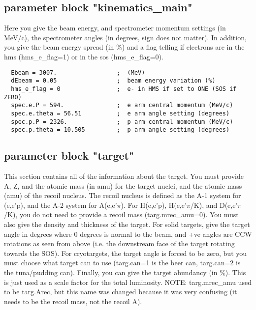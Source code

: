 \subsection{parameter block "kinematics\_main"}

Here you give the beam energy, and spectrometer momentum settings (in MeV/c),
the spectrometer angles (in degrees, sign does not matter).  In addition,
you give the beam energy spread (in \%) and a flag telling if electrons 
are in the hms (hms\_e\_flag=1) or in the sos (hms\_e\_flag=0).

\begin{verbatim}
  Ebeam = 3007.                 ;  (MeV)
  dEbeam = 0.05                 ;  beam energy variation (%)
  hms_e_flag = 0                ;  e- in HMS if set to ONE (SOS if ZERO)
  spec.e.P = 594.               ;  e arm central momentum (MeV/c)
  spec.e.theta = 56.51          ;  e arm angle setting (degrees)
  spec.p.P = 2326.              ;  p arm central momentum (MeV/c)
  spec.p.theta = 10.505         ;  p arm angle setting (degrees)
\end{verbatim}





\subsection{parameter block "target"}

This section contains all of the information about the target.  You must
provide A, Z, and the atomic mass (in amu) for the target nuclei, and the
atomic mass (amu) of the recoil nucleus.  The recoil nucleus is defined
as the A-1 system for (e,e'p), and the A-2 system for A(e,e'$\pi$).  For
H(e,e'p), H(e,e'$\pi$/K), and D(e,e'$\pi$/K), you do not need to provide a
recoil mass (targ.mrec\_amu=0).  You must also give the density and thickness of
the target.  For solid targets, give the target angle in degrees where
0 degrees is normal to the beam, and +ve angles are CCW rotations as seen
from above (i.e. the downstream face of the target rotating towards the SOS).
For cryotargets, the target angle is forced to be zero, but you must choose
what target can to use (targ.can=1 is the beer can, targ.can=2 is the
tuna/pudding can).  Finally, you can give the target abundancy (in \%).
This is just used as a scale factor for the total luminosity.  NOTE:
targ.mrec\_amu used to be targ.Arec, but this name was changed because it
was very confusing (it needs to be the recoil mass, not the recoil A).

